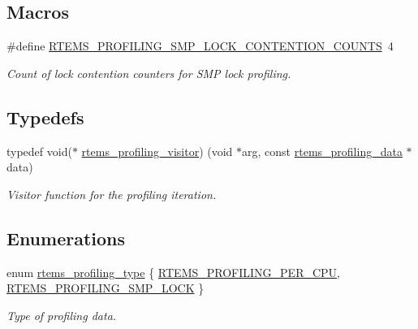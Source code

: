 \subsection*{Macros}
\begin{DoxyCompactItemize}
\item 
\mbox{\label{group__Profiling_gaa982fd0b6f3e7e29927a4efa146eb7ad}} 
\#define \mbox{\hyperlink{group__Profiling_gaa982fd0b6f3e7e29927a4efa146eb7ad}{R\+T\+E\+M\+S\+\_\+\+P\+R\+O\+F\+I\+L\+I\+N\+G\+\_\+\+S\+M\+P\+\_\+\+L\+O\+C\+K\+\_\+\+C\+O\+N\+T\+E\+N\+T\+I\+O\+N\+\_\+\+C\+O\+U\+N\+TS}}~4
\begin{DoxyCompactList}\small\item\em Count of lock contention counters for S\+MP lock profiling. \end{DoxyCompactList}\end{DoxyCompactItemize}
\subsection*{Typedefs}
\begin{DoxyCompactItemize}
\item 
typedef void($\ast$ \mbox{\hyperlink{group__Profiling_gabc727db53114f2f1bedd000b4d8b38ba}{rtems\+\_\+profiling\+\_\+visitor}}) (void $\ast$arg, const \mbox{\hyperlink{unionrtems__profiling__data}{rtems\+\_\+profiling\+\_\+data}} $\ast$data)
\begin{DoxyCompactList}\small\item\em Visitor function for the profiling iteration. \end{DoxyCompactList}\end{DoxyCompactItemize}
\subsection*{Enumerations}
\begin{DoxyCompactItemize}
\item 
enum \mbox{\hyperlink{group__Profiling_ga8e677119cdafc1bfb0cecbb6b8f48eb2}{rtems\+\_\+profiling\+\_\+type}} \{ \mbox{\hyperlink{group__Profiling_gga8e677119cdafc1bfb0cecbb6b8f48eb2a8076886829cc3752389f1db9ff73c279}{R\+T\+E\+M\+S\+\_\+\+P\+R\+O\+F\+I\+L\+I\+N\+G\+\_\+\+P\+E\+R\+\_\+\+C\+PU}}, 
\mbox{\hyperlink{group__Profiling_gga8e677119cdafc1bfb0cecbb6b8f48eb2afb2b94efa250f957d42bda049179d8ee}{R\+T\+E\+M\+S\+\_\+\+P\+R\+O\+F\+I\+L\+I\+N\+G\+\_\+\+S\+M\+P\+\_\+\+L\+O\+CK}}
 \}
\begin{DoxyCompactList}\small\item\em Type of profiling data. \end{DoxyCompactList}\end{DoxyCompactItemize}
